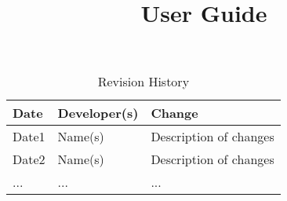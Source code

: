 \documentclass{article}
\title{User Guide\\\progname}
\author{\authname}
\date{}
\begin{document}
\begin{table}[hp]
\caption{Revision History} \label{TblRevisionHistory}
\begin{tabularx}{\textwidth}{llX}
\toprule
\textbf{Date} & \textbf{Developer(s)} & \textbf{Change}\\
\midrule
Date1 & Name(s) & Description of changes\\
Date2 & Name(s) & Description of changes\\
... & ... & ...\\
\bottomrule
\end{tabularx}
\end{table}

\newpage

\maketitle
\end{document}
